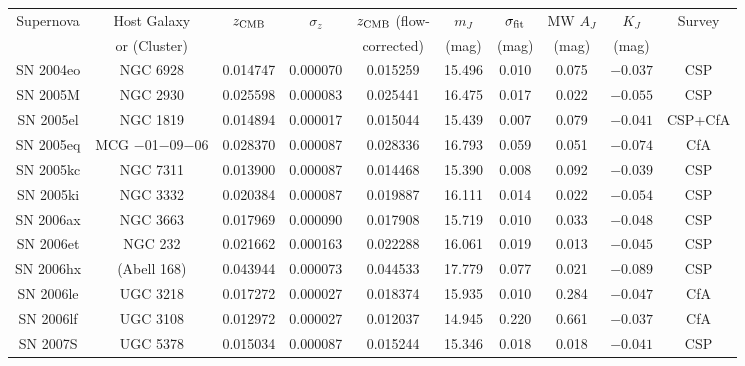 \begin{tabular}{|c|c|cc|c|cc|c|c|c|}
\hline
Supernova & Host Galaxy & $z_{\rm CMB}$ & $\sigma_z$ & $z_{\rm CMB}$ (flow- & 
$m_J$ & $\sigma_{\rm fit}$ & MW $A_J$ & $K_J$ & Survey \\
 & or (Cluster) & & & corrected) & (mag) & (mag) & (mag) & (mag) &  \\
\hline
SN 2004eo                  & NGC 6928                         &  0.014747 &  0.000070 &  0.015259 & 15.496 & 0.010 &  0.075  & $-0.037$ & CSP  \\
SN 2005M                   & NGC 2930                         &  0.025598 &  0.000083 &  0.025441 & 16.475 & 0.017 &  0.022  & $-0.055$ & CSP  \\
SN 2005el                  & NGC 1819                         &  0.014894 &  0.000017 &  0.015044 & 15.439 & 0.007 &  0.079  & $-0.041$ & CSP+CfA  \\
SN 2005eq                  & MCG $-$01$-$09$-$06              &  0.028370 &  0.000087 &  0.028336 & 16.793 & 0.059 &  0.051  & $-0.074$ & CfA  \\
SN 2005kc                  & NGC 7311                         &  0.013900 &  0.000087 &  0.014468 & 15.390 & 0.008 &  0.092  & $-0.039$ & CSP  \\
SN 2005ki                  & NGC 3332                         &  0.020384 &  0.000087 &  0.019887 & 16.111 & 0.014 &  0.022  & $-0.054$ & CSP  \\
SN 2006ax                  & NGC 3663                         &  0.017969 &  0.000090 &  0.017908 & 15.719 & 0.010 &  0.033  & $-0.048$ & CSP  \\
SN 2006et                  & NGC 232                          &  0.021662 &  0.000163 &  0.022288 & 16.061 & 0.019 &  0.013  & $-0.045$ & CSP  \\
SN 2006hx                  & (Abell 168)                      &  0.043944 &  0.000073 &  0.044533 & 17.779 & 0.077 &  0.021  & $-0.089$ & CSP  \\
SN 2006le                  & UGC 3218                         &  0.017272 &  0.000027 &  0.018374 & 15.935 & 0.010 &  0.284  & $-0.047$ & CfA  \\
SN 2006lf                  & UGC 3108                         &  0.012972 &  0.000027 &  0.012037 & 14.945 & 0.220 &  0.661  & $-0.037$ & CfA  \\
SN 2007S                   & UGC 5378                         &  0.015034 &  0.000087 &  0.015244 & 15.346 & 0.018 &  0.018  & $-0.041$ & CSP  \\

\end{tabular}
